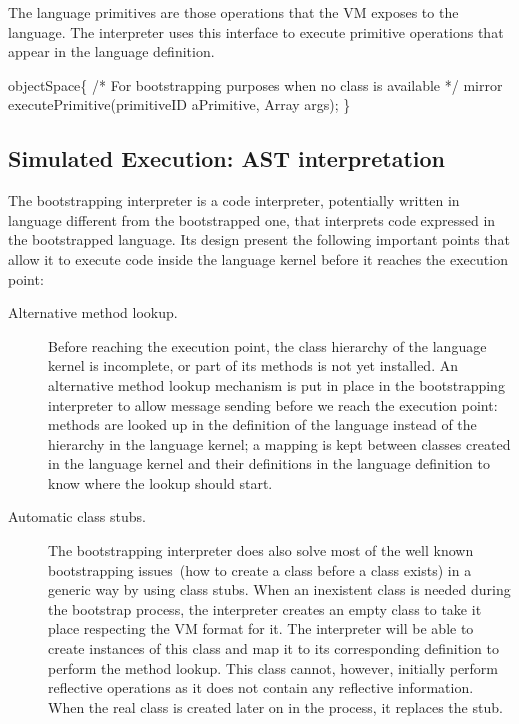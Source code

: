 The language primitives are those operations that the VM exposes to the language. The interpreter uses this interface to execute primitive operations that appear in the language definition.

\begin{code}
objectSpace\{
    /* For bootstrapping purposes when no class is available */
    mirror executePrimitive(primitiveID aPrimitive, Array args); 
\}
\end{code}



\subsection{Simulated Execution: AST interpretation}

The bootstrapping interpreter is a code interpreter, potentially written in language different from the bootstrapped one, that interprets code expressed in the bootstrapped language. Its design present the following important points that allow it to execute code inside the language kernel before it reaches the execution point:

\begin{description}
\item[Alternative method lookup.] Before reaching the execution point, the class hierarchy of the language kernel is incomplete, or part of its methods is not yet installed. An alternative method lookup mechanism is put in place in the bootstrapping interpreter to allow message sending before we reach the execution point: methods are looked up in the definition of the language instead of the hierarchy in the language kernel; a mapping is kept between classes created in the language kernel and their definitions in the language definition to know where the lookup should start.

\item[Automatic class stubs.] The bootstrapping interpreter does also solve most of the well known bootstrapping issues~(\eg how to create a class before a class exists) in a generic way by using class stubs. When an inexistent class is needed during the bootstrap process, the interpreter creates an empty class to take it place respecting the VM format for it. The interpreter will be able to create instances of this class and map it to its corresponding definition to perform the method lookup. This class cannot, however, initially perform reflective operations as it does not contain any reflective information. When the real class is created later on in the process, it replaces the stub.
\end{description}

